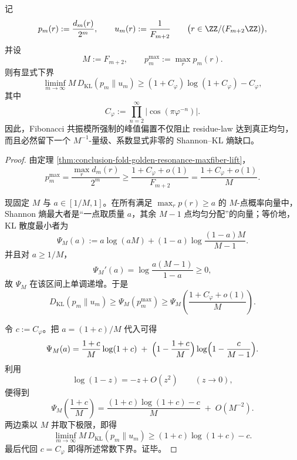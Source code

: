 \begin{theorem}\label{thm:conclusion-binfold-kl-floor-from-max-bias}
记
\[
p_m(r):=\frac{d_m(r)}{2^m},
\qquad
u_m(r):=\frac1{F_{m+2}}
\qquad
\bigl(r\in \ZZ/(F_{m+2}\ZZ)\bigr),
\]
并设
\[
M:=F_{m+2},
\qquad
p_m^{\max}:=\max_r p_m(r).
\]
则有显式下界
\[
\liminf_{m\to\infty}
M\,D_{\mathrm{KL}}(p_m\|u_m)
\ge
(1+C_\varphi)\log(1+C_\varphi)-C_\varphi,
\]
其中
\[
C_\varphi:=\prod_{n=2}^{\infty}\bigl|\cos(\pi\varphi^{-n})\bigr|.
\]
因此，Fibonacci 共振模所强制的峰值偏置不仅阻止 residue-law 达到真正均匀，而且必然留下一个 \(M^{-1}\)-量级、系数显式非零的 Shannon--KL 熵缺口。
\end{theorem}
\begin{proof}
由定理 \ref{thm:conclusion-fold-golden-resonance-maxfiber-lift}，
\[
p_m^{\max}
=
\frac{\max_r d_m(r)}{2^m}
\ge
\frac{1+C_\varphi+o(1)}{F_{m+2}}
=
\frac{1+C_\varphi+o(1)}{M}.
\]

现固定 \(M\) 与 \(a\in[1/M,1]\)。在所有满足 \(\max_r p(r)\ge a\) 的 \(M\)-点概率向量中，Shannon 熵最大者是“一点取质量 \(a\)，其余 \(M-1\) 点均匀分配”的向量；等价地，KL 散度最小者为
\[
\Psi_M(a):=
a\log(aM)+(1-a)\log\frac{(1-a)M}{M-1}.
\]
并且对 \(a\ge 1/M\)，
\[
\Psi_M'(a)
=
\log\frac{a(M-1)}{1-a}\ge 0,
\]
故 \(\Psi_M\) 在该区间上单调递增。于是
\[
D_{\mathrm{KL}}(p_m\|u_m)\ge \Psi_M(p_m^{\max})
\ge
\Psi_M\!\left(\frac{1+C_\varphi+o(1)}{M}\right).
\]

令 \(c:=C_\varphi\)。把 \(a=(1+c)/M\) 代入可得
\[
\Psi_M(a)
=
\frac{1+c}{M}\log(1+c)
\;+\;
\Bigl(1-\frac{1+c}{M}\Bigr)
\log\Bigl(1-\frac{c}{M-1}\Bigr).
\]
利用
\[
\log(1-z)=-z+O(z^2)
\qquad (z\to 0),
\]
便得到
\[
\Psi_M\!\left(\frac{1+c}{M}\right)
=
\frac{(1+c)\log(1+c)-c}{M}
\;+\;
O(M^{-2}).
\]
两边乘以 \(M\) 并取下极限，即得
\[
\liminf_{m\to\infty}
M\,D_{\mathrm{KL}}(p_m\|u_m)
\ge
(1+c)\log(1+c)-c.
\]
最后代回 \(c=C_\varphi\) 即得所述常数下界。证毕。
\end{proof}

\endinput
